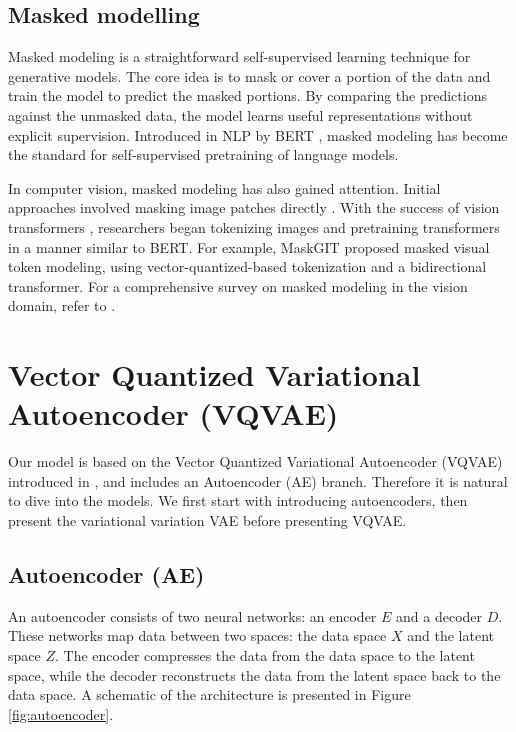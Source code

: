 \documentclass[../../thesis.tex]{subfiles}
\begin{document}
\subsection{Masked modelling}
\label{section:Masked modelling}
Masked modeling is a straightforward self-supervised learning technique for generative models. The core idea is to mask or cover a portion of the data and train the model to predict the masked portions. By comparing the predictions against the unmasked data, the model learns useful representations without explicit supervision. Introduced in NLP by BERT \cite{devlin2019bert}, masked modeling has become the standard for self-supervised pretraining of language models.\newline

In computer vision, masked modeling has also gained attention. Initial approaches involved masking image patches directly \cite{he2021masked}. With the success of vision transformers \cite{dosovitskiy2021image}, researchers began tokenizing images and pretraining transformers in a manner similar to BERT. For example, MaskGIT \cite{chang2022maskgit} proposed masked visual token modeling, using vector-quantized-based tokenization and a bidirectional transformer. For a comprehensive survey on masked modeling in the vision domain, refer to \cite{li2024masked}.

\section{Vector Quantized Variational Autoencoder (VQVAE)}
\label{section:VQVAE}
Our model is based on the Vector Quantized Variational Autoencoder (VQVAE) introduced in \cite{VQVAE}, and includes an Autoencoder (AE) branch. Therefore it is natural to dive into the models. We first start with introducing autoencoders, then present the variational variation VAE before presenting VQVAE. 

\subsection{Autoencoder (AE)}

An autoencoder consists of two neural networks: an encoder $E$ and a decoder $D$. These networks map data between two spaces: the data space $X$ and the latent space $Z$. The encoder compresses the data from the data space to the latent space, while the decoder reconstructs the data from the latent space back to the data space. A schematic of the architecture is presented in Figure \ref{fig:autoencoder}. \newline
\end{document}
